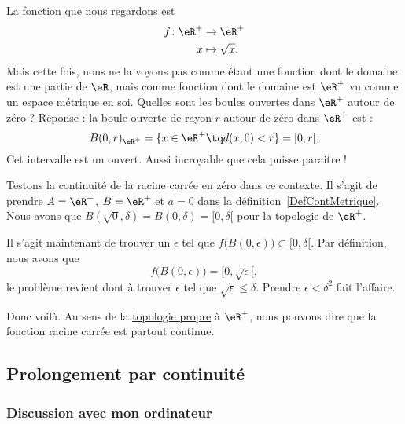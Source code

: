 La fonction que nous regardons est
\begin{equation}
\begin{aligned}
f \colon \eR^+&\to \eR^+ \\
   x&\mapsto \sqrt{x}.
\end{aligned}
\end{equation}
Mais cette fois, nous ne la voyons pas comme étant une fonction dont le domaine est une partie de $\eR$, mais comme fonction dont le domaine est $\eR^+$ vu comme un espace métrique en soi. Quelles sont les boules ouvertes dans $\eR^+$ autour de zéro ? Réponse : la boule ouverte de rayon $r$ autour de zéro dans $\eR^+$ est :
\[
  B(0,r)_{\eR^+}=\{ x\in\eR^+\tq d(x,0)<r \}=[0,r[.
\]
Cet intervalle est un ouvert. Aussi incroyable que cela puisse paraitre !

Testons la continuité de la racine carrée en zéro dans ce contexte. Il s'agit de prendre $A=\eR^+$, $B=\eR^+$ et $a=0$ dans la définition~\ref{DefContMetrique}. Nous avons que $B(\sqrt{0},\delta)=B(0,\delta)=[0,\delta[$ pour la topologie de $\eR^+$.

Il s'agit maintenant de trouver un $\epsilon$ tel que $f\big( B(0,\epsilon) \big)\subset [0,\delta[$. Par définition, nous avons que
\[
  f\big( B(0,\epsilon) \big)=[0,\sqrt{\epsilon}[,
\]
le problème revient dont à trouver $\epsilon$ tel que $\sqrt{\epsilon}\leq\delta$. Prendre $\epsilon<\delta^2$ fait l'affaire.


Donc voilà. Au sens de la \href{http://fr.wikipedia.org/wiki/Topologie_induite}{topologie propre} à $\eR^+$, nous pouvons dire que la fonction racine carrée est partout continue.

\subsection{Prolongement par continuité}

\subsubsection{Discussion avec mon ordinateur}

